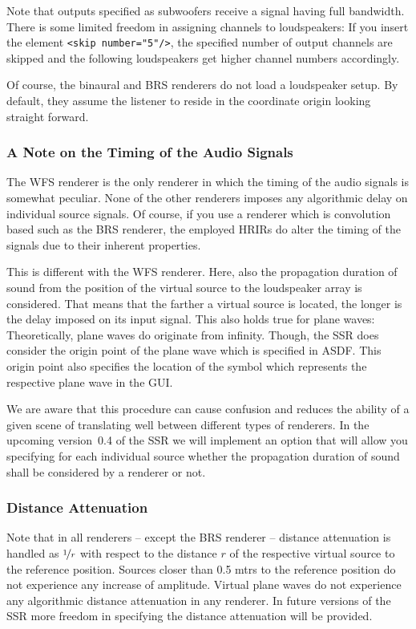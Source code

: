 \noindent Note that outputs specified as subwoofers receive a signal having
full bandwidth.
There is some limited freedom in assigning channels to loudspeakers:
If you insert the element \texttt{<skip number="5"/>},
the specified number of output channels are skipped and the following
loudspeakers get higher channel numbers accordingly.

Of course, the binaural and BRS renderers do not load a loudspeaker setup. By
default, they assume the listener to reside in the coordinate origin looking
straight forward.

\subsubsection{A Note on the Timing of the Audio Signals}

The WFS renderer is the only renderer in which the timing of the audio signals is 
somewhat peculiar. None of the other renderers imposes any algorithmic delay on 
individual source signals. Of course, if you use a renderer which is convolution 
based such as the BRS renderer, the employed HRIRs do alter the timing of the 
signals due to their inherent properties. 

This is different with the WFS renderer. Here, also the propagation duration of 
sound from the position of the virtual source to the loudspeaker array is 
considered. That means that the farther a virtual source is located, the longer
is the delay imposed on its input signal. This also holds true for plane waves: 
Theoretically, plane waves do originate from infinity. Though, the SSR does consider
the origin point of the plane wave which is specified in ASDF. This origin point 
also specifies the location of the symbol which represents the respective plane
wave in the GUI. 

We are aware that this procedure can cause confusion and reduces the ability of
a given scene of translating well between different types of renderers. In the 
upcoming version~0.4 of the SSR we will implement an option that will allow you 
specifying for each individual source whether the propagation duration of sound 
shall be considered by a renderer or not. 

\subsubsection{Distance Attenuation}

Note that in all renderers -- except the BRS renderer -- distance attenuation
is handled as $\nicefrac{1}{r}$ with respect to the distance $r$ of the
respective virtual source to the reference position. Sources closer than 0.5
mtrs to the reference position do not experience any increase of amplitude.
Virtual plane waves do not experience any algorithmic distance attenuation in
any renderer.
In future versions of the SSR more freedom in specifying the distance attenuation 
will be provided.

